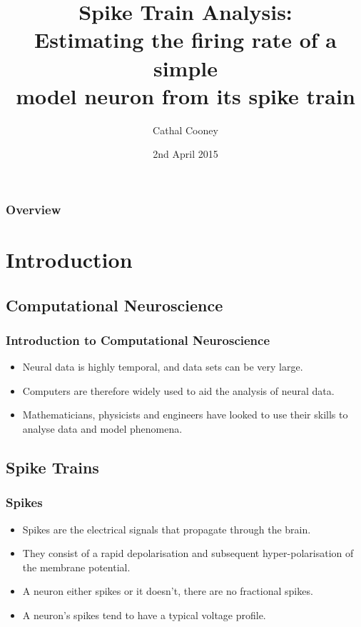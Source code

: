 \documentclass{beamer}
\title[Spike Train Analysis]
{
Spike Train Analysis: \\ Estimating the firing rate of a simple \\model neuron from its spike train
}
\author{
Cathal Cooney
}
\institute[TCD]
{
School of Maths, Trinity College Dublin
}
\date{2nd April 2015}
\begin{document}
\begin{frame}
\titlepage
\end{frame}

\begin{frame}
\frametitle{Overview}
\tableofcontents
\end{frame}

\section{Introduction}
\subsection{Computational Neuroscience}
\begin{frame}
\frametitle{Introduction to Computational Neuroscience}
\begin{itemize}
\item Neural data is highly temporal, and data sets can be very large.
\pause
\bigskip
\item Computers are therefore widely used to aid the analysis of neural data.
\pause
\bigskip
\item Mathematicians, physicists and engineers have looked to use their skills to analyse data and model phenomena.
\end{itemize}
\end{frame}

\subsection{Spike Trains}
\begin{frame}
\frametitle{Spikes}
\begin{itemize}
\item Spikes are the electrical signals that propagate through the brain. 
\pause
\bigskip
\item They consist of a rapid depolarisation and subsequent hyper-polarisation of the membrane potential.
\pause
\bigskip
\item A neuron either spikes or it doesn't, there are no fractional spikes.
\pause
\bigskip
\item A neuron's spikes tend to have a typical voltage profile.
\end{itemize}
\end{frame}
\end{document}
